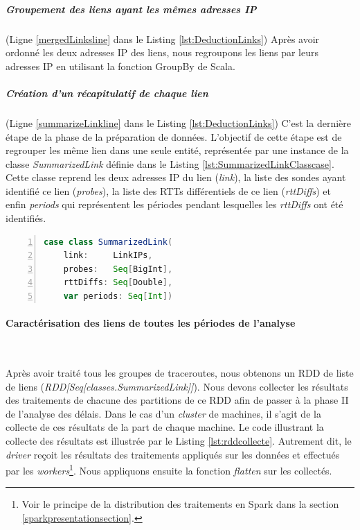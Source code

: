 \subparagraph{Groupement des liens ayant les mêmes adresses IP} (Ligne \ref{mergedLinksline} dans le Listing \ref{lst:DeductionLinks})
Après avoir ordonné les deux adresses IP des liens, nous regroupons les liens par leurs adresses IP en utilisant la fonction GroupBy de Scala.

\subparagraph{Création d'un récapitulatif de chaque lien} (Ligne \ref{summarizeLinkline} dans le Listing \ref{lst:DeductionLinks})
C'est la dernière étape de la phase de la préparation de données.  L'objectif de cette étape est de regrouper les même lien dans une seule entité, représentée par une instance de la classe \textit{SummarizedLink} définie dans le Listing \ref{lst:SummarizedLinkClasscase}.
 Cette classe reprend les deux  adresses IP du lien (\textit{link}), la liste des sondes ayant identifié ce lien (\textit{probes}), la liste des RTTs différentiels de ce lien (\textit{rttDiffs}) et enfin  \textit{periods} qui  représentent les périodes  pendant lesquelles les \textit{rttDiffs} ont été identifiés. 


\begin{lstlisting}[language=scala,firstnumber=1, caption={Définition de la classe SummarizedLink},label={lst:SummarizedLinkClasscase}, basicstyle = \footnotesize,escapechar=|,numbers=left,
stepnumber=1]
case class SummarizedLink(
	link:     LinkIPs,
	probes:   Seq[BigInt],
	rttDiffs: Seq[Double],
	var periods: Seq[Int])
\end{lstlisting}


\paragraph{Caractérisation des liens de toutes les périodes de l'analyse}~

Après avoir traité tous les groupes de traceroutes, nous obtenons un RDD de liste de liens (\textit{RDD[Seq[classes.SummarizedLink]]}). Nous devons collecter les résultats des traitements de chacune des partitions de ce RDD afin de passer à la phase II de l'analyse des délais. Dans le cas d'un \textit{cluster} de machines, il s'agit de la collecte de ces résultats de la part de chaque machine.  
Le code illustrant la collecte des résultats est illustrée par le Listing \ref{lst:rddcollecte}. Autrement dit, le \textit{driver}  reçoit les résultats des traitements appliqués sur les données et effectués par les \textit{workers}\footnote{Voir le principe de la distribution des traitements en Spark dans la section \ref{sparkpresentationsection}.}. Nous appliquons ensuite la fonction \textit{flatten} sur les collectés.


